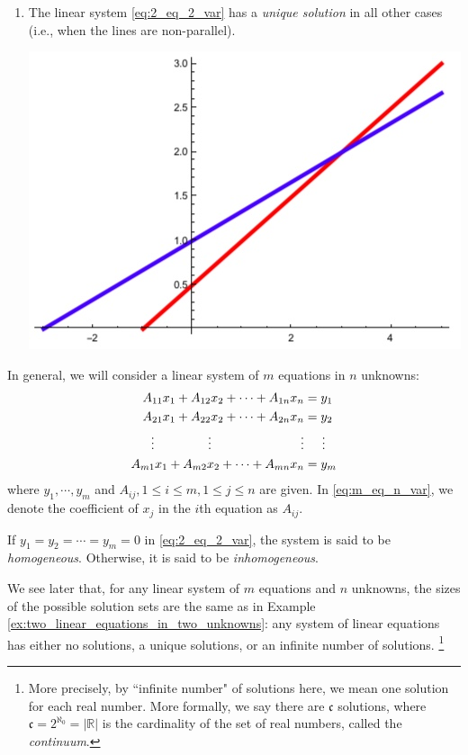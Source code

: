 \documentclass[12pt,letterpaper,reqno]{article}
\numberwithin{equation}{section}
\newcommand{\ti}[1]{\textit{#1}}
\begin{document}
\begin{example}
\begin{enumerate}[(1)]
\item The linear system \eqref{eq:2_eq_2_var} has a \emph{unique solution} in all other cases (i.e., when the lines are non-parallel).
\begin{center}
\includegraphics[scale=0.5]{figures_mvc/two_lines_unique_soln}	
\end{center}
\end{enumerate}
\end{example}

In general, we will consider a linear system of $m$ equations in $n$ unknowns:
\begin{equation}\label{eq:m_eq_n_var}
\begin{split}
	A_{11}x_1+A_{12}x_2+\cdots + A_{1n}x_n &=y_1 \\
	A_{21}x_1+A_{22}x_2+\cdots + A_{2n}x_n &=y_2 \\
	\vdots \hspace{1.5cm} \vdots \hspace{2.5cm} \vdots & \hspace{0.5cm}\vdots  \\
	A_{m1}x_1+A_{m2}x_2+\cdots + A_{mn}x_n &=y_m \\
\end{split}	
\end{equation}
where $y_1,\cdots, y_m$ and $A_{ij}, 1 \leq i \leq m, 1 \leq j \leq n$ are given. In \eqref{eq:m_eq_n_var}, we denote the coefficient of $x_j$ in the $i$th equation as $A_{ij}$.


\begin{defn}\label{def:homogeneous_and_inhomogeneous_sytems}
If $y_1=y_2=\cdots=y_m=0$ in 
\eqref{eq:2_eq_2_var}, the system is said to be \ti{homogeneous}. Otherwise, it is said to be \ti{inhomogeneous}.
\end{defn}
We see later that, for any linear system of $m$ equations and $n$ unknowns, the sizes of the possible solution sets are the same as in Example \ref{ex:two_linear_equations_in_two_unknowns}: any system of linear equations has either no solutions, a unique solutions, or an infinite number of solutions. \footnote{More precisely, by ``infinite number" of solutions here, we mean one solution for each real number. More formally, we say there are $\mathfrak{c}$ solutions, where $\mathfrak{c}=2^{\aleph_0}=|\mathbb{R}|$ is the cardinality of the set of real numbers, called the \ti{continuum}.}
\end{document}
